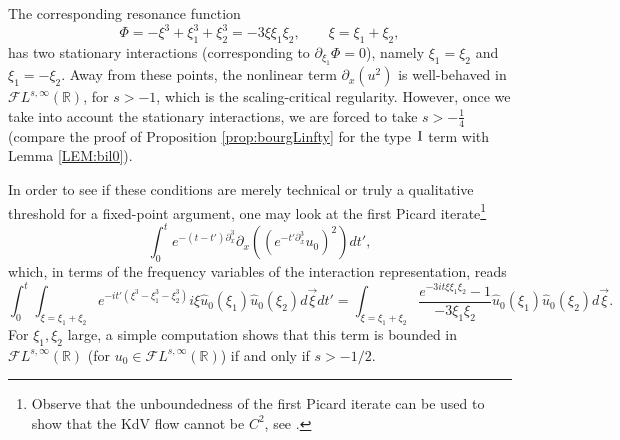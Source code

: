 \documentclass[%
11pt,  reqno]{amsart}
\newcommand{\I}{\hspace{0.2mm}\textup{I}\hspace{0.2mm}}
\newcommand{\5}{\textup{V}}
\newcommand{\FL}{\mathcal{F} L}
\DeclareMathOperator*{\intt}{\int}
\newcommand{\dx}{\partial_x}
\theoremstyle{remark}
\newcommand{\R}{\mathbb{R}}
\numberwithin{equation}{section}
\numberwithin{theorem}{section}
\begin{document}
	The corresponding resonance function
	\begin{equation}
		\Phi=-\xi^3+\xi_1^3+\xi_2^3 = -3\xi\xi_1\xi_2, \qquad \xi=\xi_1+\xi_2,
	\end{equation}
	has two stationary interactions (corresponding to $\partial_{\xi_1}\Phi=0$), namely $\xi_1=\xi_2$ and $\xi_1=-\xi_2$. Away from these points, the nonlinear term $\partial_x(u^2)$ is well-behaved in $\FL^{s,\infty}(\R)$,
	for $s>-1$, which is the scaling-critical regularity. 
However, once we take into account the stationary interactions, we are forced to take $s>-\frac14$ (compare the proof of Proposition \ref{prop:bourgLinfty} for the type $\I$ term with Lemma \ref{LEM:bil0}).
    
	
	\medskip
	In order to see if these conditions are merely technical or truly a qualitative threshold for a fixed-point argument, one may look at the first Picard iterate\footnote{Observe that the unboundedness of the first Picard iterate can be used to show that the KdV flow cannot be $C^2$, see  \cite{bou_ill_kdv, MolTzeSaut_ill, Tzvetkov_ill}.}
	$$
	\int_0^t e^{-(t-t')\dx^3}\partial_x((e^{-t'\dx^3}u_0)^2)dt',
	$$
	which, in terms of the frequency variables of the interaction representation, reads
	\begin{equation}\label{eq:first_picard}
		\int_0^t \intt_{\xi=\xi_1+\xi_2}e^{-it' (\xi^3 -
			\xi_1^3 - \xi_2^3) } i\xi \widehat{u}_0( \xi_1) \widehat{u}_0(\xi_2) d\vec{\xi} dt' = \intt_{\xi=\xi_1+\xi_2}\frac{e^{-3it\xi\xi_1\xi_2}-1}{-3\xi_1\xi_2} \widehat{u}_0( \xi_1) \widehat{u}_0(\xi_2) d\vec{\xi}.
	\end{equation}
	For $\xi_1, \xi_2$ large, 
	a simple computation shows that this term is bounded in $\mathcal{F}L^{s,\infty}(\R)$ (for $u_0\in \mathcal{F}L^{s,\infty}(\R)$) if and only if $s>-1/2$.
	
\end{document}
